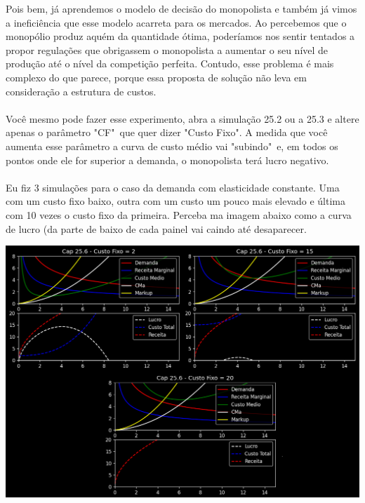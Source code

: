 \documentclass[a4paper,11pt,oneside]{book}
\theoremstyle{definition}
\theoremstyle{break}
\begin{document}
Pois bem, já aprendemos o modelo de decisão do monopolista e também já vimos a ineficiência que esse modelo acarreta para os mercados. Ao percebemos que o monopólio produz aquém da quantidade ótima, poderíamos nos sentir tentados a propor regulações que obrigassem o monopolista a aumentar o seu nível de produção até o nível da competição perfeita. Contudo, esse problema é mais complexo do que parece, porque essa proposta de solução não leva em consideração a estrutura de custos.
\\
\\
Você mesmo pode fazer esse experimento, abra a simulação 25.2 ou a 25.3 e altere apenas o parâmetro "CF"\ que quer dizer "Custo Fixo". A medida que você aumenta esse parâmetro a curva de custo médio vai "subindo"\ e, em todos os pontos onde ele for superior a demanda, o monopolista terá lucro negativo.
\\
\\
Eu fiz 3 simulações para o caso da demanda com elasticidade constante. Uma com um custo fixo baixo, outra com um custo um pouco mais elevado e última com 10 vezes o custo fixo da primeira. Perceba ma imagem abaixo como a curva de lucro (da parte de baixo de cada painel vai caindo até desaparecer.

\begin{center}
\includegraphics[scale=0.38]{cap25_6-monopolio_natural.png}
\end{center}
\end{document}
